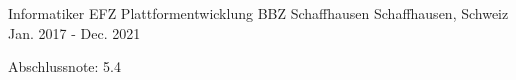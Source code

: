 

\begin{cventries}
  \cventry
    {Informatiker EFZ Plattformentwicklung} %
    {BBZ Schaffhausen} %
    {Schaffhausen, Schweiz} %
    {Jan. 2017 - Dec. 2021} %
    {
      \begin{cvitems}
        \item {Abschlussnote: 5.4}
      \end{cvitems}
    }
\end{cventries}

